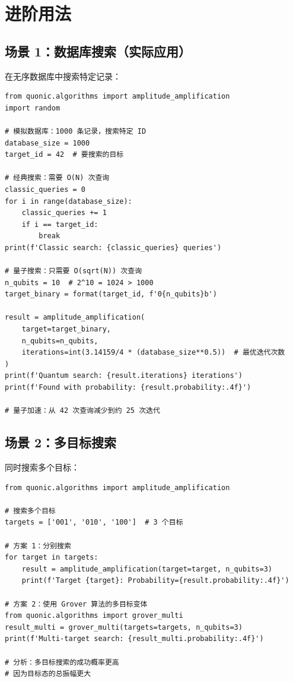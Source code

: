 \documentclass[12pt,a4paper]{article}
\begin{document}
\section{进阶用法}

\subsection{场景 1：数据库搜索（实际应用）}

在无序数据库中搜索特定记录：

\begin{verbatim}
from quonic.algorithms import amplitude_amplification
import random

# 模拟数据库：1000 条记录，搜索特定 ID
database_size = 1000
target_id = 42  # 要搜索的目标

# 经典搜索：需要 O(N) 次查询
classic_queries = 0
for i in range(database_size):
    classic_queries += 1
    if i == target_id:
        break
print(f'Classic search: {classic_queries} queries')

# 量子搜索：只需要 O(sqrt(N)) 次查询
n_qubits = 10  # 2^10 = 1024 > 1000
target_binary = format(target_id, f'0{n_qubits}b')

result = amplitude_amplification(
    target=target_binary,
    n_qubits=n_qubits,
    iterations=int(3.14159/4 * (database_size**0.5))  # 最优迭代次数
)
print(f'Quantum search: {result.iterations} iterations')
print(f'Found with probability: {result.probability:.4f}')

# 量子加速：从 42 次查询减少到约 25 次迭代
\end{verbatim}

\subsection{场景 2：多目标搜索}

同时搜索多个目标：

\begin{verbatim}
from quonic.algorithms import amplitude_amplification

# 搜索多个目标
targets = ['001', '010', '100']  # 3 个目标

# 方案 1：分别搜索
for target in targets:
    result = amplitude_amplification(target=target, n_qubits=3)
    print(f'Target {target}: Probability={result.probability:.4f}')

# 方案 2：使用 Grover 算法的多目标变体
from quonic.algorithms import grover_multi
result_multi = grover_multi(targets=targets, n_qubits=3)
print(f'Multi-target search: {result_multi.probability:.4f}')

# 分析：多目标搜索的成功概率更高
# 因为目标态的总振幅更大
\end{verbatim}
\end{document}
